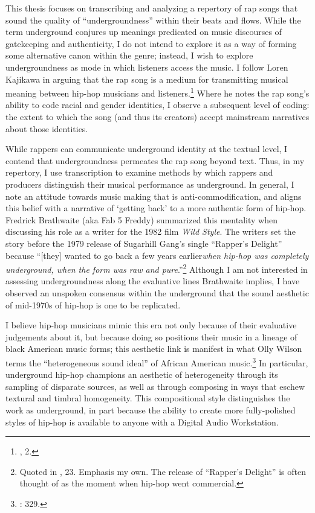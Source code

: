 This thesis focuses on transcribing and analyzing a repertory of rap songs that sound
the quality of ``undergroundness'' within their beats and flows. While the term underground 
conjures up meanings predicated on music discourses of gatekeeping and authenticity, I do 
not intend to explore it as a way of forming some alternative canon within the genre; instead, 
I wish to explore undergroundness as mode in which listeners access the music. I follow Loren 
Kajikawa in arguing that the rap song is a medium for transmitting musical meaning between 
hip-hop musicians and listeners.\footnote{\cite{lorenkajikawaSoundingRaceRap2015}, 2.} Where 
he notes the rap song's ability to code racial and gender identities, I observe a subsequent 
level of coding: the extent to which the song (and thus its creators) accept mainstream narratives 
about those identities.

While rappers can communicate underground identity at the textual level, I contend that undergroundness
permeates the rap song beyond text. Thus, in my repertory, I use transcription to examine methods by which
rappers and producers distinguish their musical performance as underground. In general, I note an attitude
towards music making that is anti-commodification, and aligns this belief with a narrative of `getting 
back' to a more authentic form of hip-hop. Fredrick Brathwaite (aka Fab 5 Freddy) summarized this mentality
when discussing his role as a writer for the 1982 film \textit{Wild Style}. The writers set the story 
before the 1979 release of Sugarhill Gang's single ``Rapper's Delight'' because ``[they] wanted to go back
a few years earlier\textellipsis \emph{when hip-hop was completely underground, when the form was raw and
pure}.''\footnote{Quoted in \cite{justinawilliamsRhyminStealinMusical2013}, 23. Emphasis my own. The release
of ``Rapper's Delight'' is often thought of as the moment when hip-hop went commercial.} Although I am not
interested in assessing undergroundness along the evaluative lines Brathwaite implies, I have observed an
unspoken consensus within the underground that the sound aesthetic of mid-1970s of hip-hop is one to be
replicated.

I believe hip-hop musicians mimic this era not only because of their evaluative judgements about it, but
because doing so positions their music in a lineage of black American music forms; this aesthetic link is
manifest in what Olly Wilson terms the ``heterogeneous sound ideal'' of African American
music.\footnote{\cite{ollywilsonHeterogeneousSoundIdeal1992}: 329.} In particular, underground hip-hop
champions an aesthetic of heterogeneity through its sampling of disparate sources, as well as  through
composing in ways that eschew textural and timbral homogeneity. This compositional style distinguishes the
work as underground, in part because the ability to create more fully-polished styles of hip-hop is available
to anyone with a Digital Audio Workstation. 

